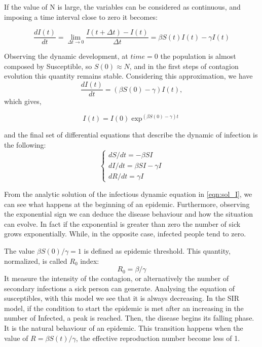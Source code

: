 If the value of N is large, the variables can be considered as continuous, and imposing a time interval close to zero it becomes:

\begin{equation}
	\frac{d I(t)}{dt} = \lim_{\Delta t \rightarrow  0} \frac{I(t+\Delta t)-I(t)}{\Delta t} = \beta S(t) I(t)- \gamma I(t)
\end{equation}

Observing the dynamic development,  at $time = 0$ the population is almost composed by Susceptible, so $S(0) \approx N$, and in the first steps of contagion evolution this quantity remains stable. Considering this approximation, we have
\begin{equation}
		\frac{d I(t)}{dt} = (\beta S(0)-\gamma)I(t),
\end{equation} 
which gives,

\begin{equation}
	I(t) = I(0) \exp ^{(\beta S(0)- \gamma)t}
	\label{eqn:sol_I}
\end{equation}

 and the final set of differential equations that  describe the dynamic of infection is the following:
 \begin{equation}
 	\begin{cases}
 		dS / dt = -\beta S I \\
 		dI / dt = \beta S I - \gamma I\\
 		dR / dt =  \gamma I
 	\end{cases}
 \end{equation}


From the analytic solution  of the infectious dynamic equation in \ref{eqn:sol_I}, we can see what happens at the beginning of an epidemic. Furthermore, observing the exponential sign we can deduce the disease behaviour and how the situation can evolve.
In fact if the exponential is greater than zero the number of sick grows exponentially. While, in the opposite case, infected people tend to zero. 

The value $ \beta S(0)/\gamma = 1$ is defined as epidemic threshold. This quantity, normalized, is called $R_0$ index:
\begin{equation}
	R_0 = \beta/\gamma
	\label{eqn:basic_rep_number}
\end{equation}
It measure the intensity of the contagion, or alternatively the number of secondary infections a sick person can generate. Analysing the equation of susceptibles, with this model we see that it is always decreasing. In the SIR model, if the condition to start the epidemic is met after an increasing in the number of Infected, a peak is reached. Then, the disease begins its falling phase. It is the natural behaviour of an epidemic.
This transition happens when the value of $R = \beta S(t)/\gamma$, the effective reproduction number become less of 1.


